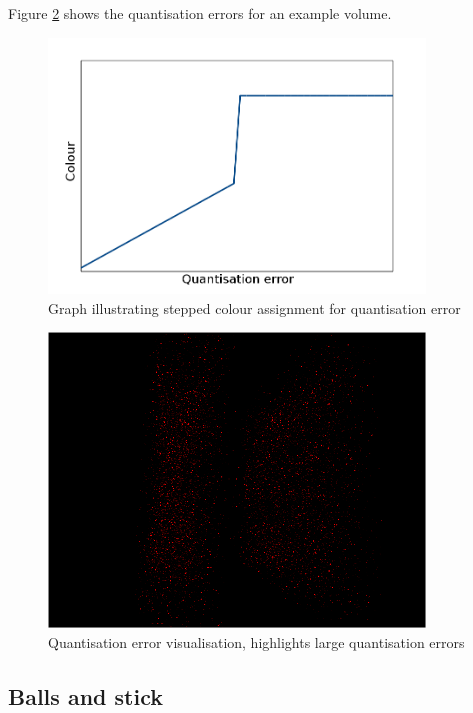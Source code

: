 Figure \ref{fig:implementation_quanterror} shows the quantisation errors for an
example volume.

\begin{figure}[h!]
  \begin{center}
    \includegraphics[width=100mm]{quant_colour_graph}
  \end{center}
  \caption{Graph illustrating stepped colour assignment for quantisation error}
  \label{fig:implementation_quantgraph}
\end{figure}

\begin{figure}[h!]
  \begin{center}
    \includegraphics[width=100mm]{quanterror}
  \end{center}
  \caption{Quantisation error visualisation, highlights large quantisation
  errors}
  \label{fig:implementation_quanterror}
\end{figure}


\subsection{Balls and stick}
\label{sub:implementation_ballstick}

